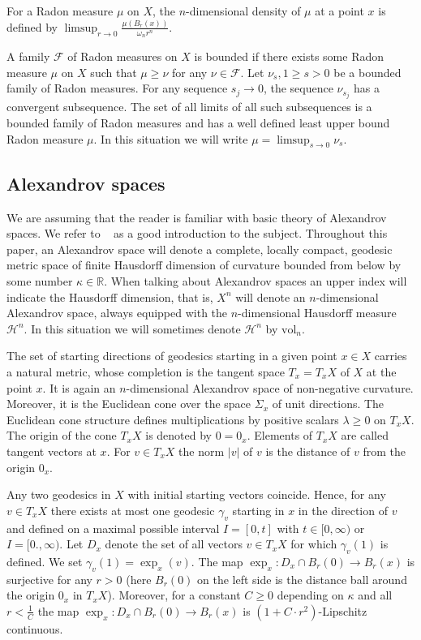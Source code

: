\documentclass[12pt,leqno]{amsart}
\numberwithin{equation}{section}
\theoremstyle{definition}
\theoremstyle{remark}
\newcommand{\vol}{\mathrm{vol}}
\newcommand{\R}{\mathbb{R}}
\begin{document}
For a Radon measure $\mu$ on $X$, the $n$-dimensional density of $\mu$ at a point $x$ is defined by  $\limsup _{r\to 0} \frac {\mu (B_r(x))} {\omega _n r^n}$.

 A family   $\mathcal F$ of Radon measures on $X$ is bounded if there exists some Radon measure $\mu$ on $X$ such that $\mu \geq \nu $ for any $\nu \in \mathcal F$.  Let $\nu _s, 1\geq s >0$ be a bounded family of Radon measures. For any sequence $s_j\to 0$, the sequence $\nu _{s_j}$ has a convergent
subsequence. The set of all limits of all such subsequences is a bounded family of Radon measures and has a well defined least upper bound Radon measure $\mu$. In  this situation we will write $\mu =\limsup _{s\to 0} \nu _s$.   



\subsection{Alexandrov spaces} \label{subsec:Alex}
We are assuming that the reader is familiar with basic theory of Alexandrov spaces. We refer to ~\cite{BGP} as a good introduction to the subject. 
Throughout this paper, an Alexandrov space will denote a complete, locally compact, geodesic metric space of finite Hausdorff dimension of curvature bounded from below by some 
number $\kappa \in \R$. 
When talking about Alexandrov spaces an upper index will indicate the Hausdorff dimension, that is, $X^n$ will denote an $n$-dimensional Alexandrov space, always equipped with the $n$-dimensional Hausdorff measure $\mathcal H^n$. In this situation we will sometimes denote
 $\mathcal H^n$ by $\vol_n$.

The set of starting directions of geodesics starting in a given point $x\in X$ carries a natural metric, whose completion is the tangent space $T_x=T_xX$
of $X$ at the point $x$.  It is again an $n$-dimensional Alexandrov space of non-negative curvature. Moreover, it is the Euclidean cone
over the space $\Sigma _x$ of unit directions. The Euclidean cone structure defines multiplications by positive scalars $\lambda \geq 0$ on $T_xX$. The origin
of the cone $T_xX$ is denoted by $0=0_x$. Elements of $T_xX$ are called tangent vectors at $x$. For $v\in T_xX$ the norm $|v|$ of $v$ is the distance of $v$ from the origin $0_x$. 




Any two geodesics in $X$ with initial starting vectors coincide. Hence,
for any $v\in T_xX$ there exists at most one geodesic $\gamma _v$  starting in $x$ in the direction of $v$ and defined on a maximal possible interval $I =[0,t]$ with $t\in [0, \infty )$ 
or $I=[0.,\infty)$.  Let $D_x$ denote the set of all vectors $v\in T_xX$ for which $\gamma _v(1)$ is defined.
We set $\gamma _v (1)=\exp_x (v)$. The map $\exp_x :D_x \cap B_r(0) \to B_r(x)$ is surjective for any $r>0$ (here $B_r(0)$ on the left side is the distance ball around the origin $0_x$ in $T_xX$). Moreover, for a constant $C\geq 0$ depending on $\kappa$ and all $r< \frac 1 C$ the map $\exp_x :D_x \cap B_r(0) \to B_r(x)$ is  $(1+ C \cdot  r^2)$-Lipschitz continuous.
\end{document}
